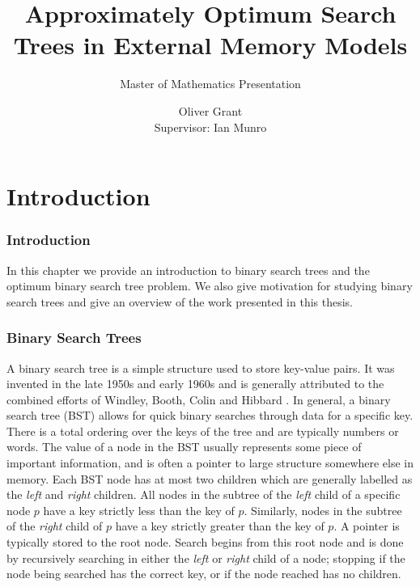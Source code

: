 \documentclass[]{beamer}
\title{Approximately Optimum Search
Trees in External Memory Models}
\subtitle{Master of Mathematics Presentation}
\author{Oliver Grant \\
Supervisor: Ian Munro}
\theoremstyle{plain}
\begin{document}
 \date{}
\begin{frame}
  \titlepage
\end{frame}


\section{Introduction}

\begin{frame}
\frametitle{Introduction}


In this chapter we provide an introduction to binary search trees and the optimum binary search tree problem. We also give motivation for studying binary search trees and give an overview of the work presented in this thesis.
\end{frame}


\begin{frame} \frametitle{Binary Search Trees}

A binary search tree is a simple structure used to store key-value pairs. It was invented in the late 1950s and early 1960s and is generally attributed to the combined efforts of Windley, Booth, Colin and Hibbard \cite{windley1960trees, booth1960efficiency, hibbard1962some}. In general, a binary search tree (BST) allows for quick binary searches through data for a specific key. There is a total ordering over the keys of the tree and are typically numbers or words. The value of a node in the BST usually represents some piece of important information, and is often a pointer to large structure somewhere else in memory. Each BST node has at most two children which are generally labelled as the \textit{left} and \textit{right} children. All nodes in the subtree of the \textit{left} child of a specific node $p$ have a key strictly less than the key of $p$. Similarly, nodes in the subtree of the \textit{right} child of $p$ have a key strictly greater than the key of $p$. A pointer is typically stored to the root node. Search begins from this root node and is done by recursively searching in either the \textit{left} or \textit{right} child of a node; stopping if the node being searched has the correct key, or if the node reached has no children.
\end{frame}
\end{document}
